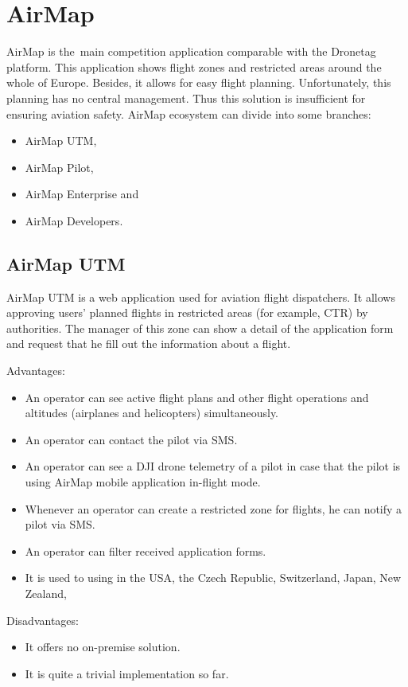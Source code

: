\section{AirMap}\label{sec:airmap}
AirMap is the~main competition application comparable with the Dronetag platform.\cite{airMap}
This application shows flight zones and restricted areas around the whole of Europe.
Besides, it allows for easy flight planning.
Unfortunately, this planning has no central management.
Thus this solution is insufficient for ensuring aviation safety.
AirMap ecosystem can divide into some branches:
\begin{itemize}
    \item AirMap UTM,
    \item AirMap Pilot,
    \item AirMap Enterprise and
    \item AirMap Developers.
\end{itemize}

\subsection{AirMap UTM}\label{subsec:airmap-utm}
AirMap UTM is a web application used for aviation flight dispatchers.
It allows approving users’ planned flights in restricted areas (for example, CTR) by authorities.
The manager of this zone can show a detail of the application form and request that he fill out the information about a flight.

Advantages:
\begin{itemize}
    \item An operator can see active flight plans and other flight operations and altitudes (airplanes and helicopters) simultaneously.
    \item An operator can contact the pilot via SMS.
    \item An operator can see a DJI drone telemetry of a pilot in case that the pilot is using AirMap mobile application in-flight mode.
    \item Whenever an operator can create a restricted zone for flights, he can notify a pilot via SMS.
    \item An operator can filter received application forms.
    \item It is used to using in the USA, the Czech Republic, Switzerland, Japan, New Zealand, \textellipsis
\end{itemize}
Disadvantages:
\begin{itemize}
    \item It offers no on-premise solution.
    \item It is quite a trivial implementation so far.
\end{itemize}


